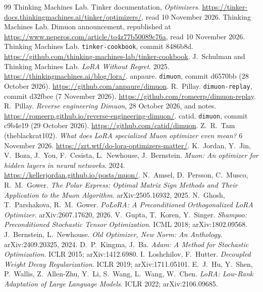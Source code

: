\documentclass[11pt]{article}
\begin{document}
\begin{thebibliography}{99}\small
{} Thinking Machines Lab. Tinker documentation, \emph{Optimizers}.
\url{https://tinker-docs.thinkingmachines.ai/tinker/optimizers/}, read 10 November 2026.
 Thinking Machines Lab. Dimuon announcement, republished at
\url{https://www.neperos.com/article/to4z77b50089c76a}, read 10 November 2026.
 Thinking Machines Lab. \texttt{tinker-cookbook}, commit 8486b8d.
\url{https://github.com/thinking-machines-lab/tinker-cookbook}.
 J.~Schulman and Thinking Machines Lab. \emph{LoRA Without Regret}. 2025.
\url{https://thinkingmachines.ai/blog/lora/}.
 anpaure. \texttt{dimuon}, commit d6570bb (28 October 2026).
\url{https://github.com/anpaure/dimuon}.
 R.~Pillay. \texttt{dimuon-replay}, commit d32fbee (7 November 2026).
\url{https://github.com/romeerp/dimuon-replay}.
 R.~Pillay. \emph{Reverse engineering Dimuon}, 28 October 2026, and notes.
\url{https://romeerp.github.io/reverse-engineering-dimuon/}.
 catid. \texttt{dimuon}, commit c9b4e19 (29 October 2026).
\url{https://github.com/catid/dimuon}.
 Z.~R.~Tam (theblackcat102). \emph{What does LoRA specialized Muon optimizer even mean?}
6 November 2026. \url{https://zrt.wtf/do-lora-optimizers-matter/}.
 K.~Jordan, Y.~Jin, V.~Boza, J.~You, F.~Cesista, L.~Newhouse, J.~Bernstein.
\emph{Muon: An optimizer for hidden layers in neural networks}. 2024.
\url{https://kellerjordan.github.io/posts/muon/}.
 N.~Amsel, D.~Persson, C.~Musco, R.~M.~Gower. \emph{The Polar Express: Optimal
Matrix Sign Methods and Their Application to the Muon Algorithm}. arXiv:2505.16932, 2025.
 N.~Ghosh, T.~Parshakova, R.~M.~Gower. \emph{PoLoRA: A Preconditioned Orthogonalized
LoRA Optimizer}. arXiv:2607.17620, 2026.
 V.~Gupta, T.~Koren, Y.~Singer. \emph{Shampoo: Preconditioned Stochastic Tensor
Optimization}. ICML 2018; arXiv:1802.09568.
 J.~Bernstein, L.~Newhouse. \emph{Old Optimizer, New Norm: An Anthology}.
arXiv:2409.20325, 2024.
 D.~P.~Kingma, J.~Ba. \emph{Adam: A Method for Stochastic Optimization}. ICLR 2015;
arXiv:1412.6980.
 I.~Loshchilov, F.~Hutter. \emph{Decoupled Weight Decay Regularization}. ICLR 2019;
arXiv:1711.05101.
 E.~J.~Hu, Y.~Shen, P.~Wallis, Z.~Allen-Zhu, Y.~Li, S.~Wang, L.~Wang, W.~Chen.
\emph{LoRA: Low-Rank Adaptation of Large Language Models}. ICLR 2022; arXiv:2106.09685.
\end{thebibliography}
\end{document}
